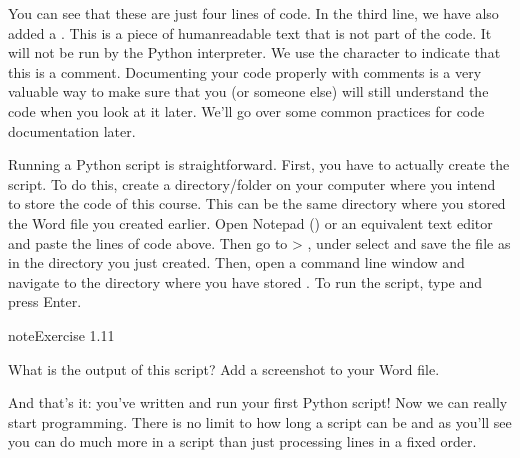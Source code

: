 \documentclass[letterpaper,10pt,english]{jupyterBook}
\begin{document}
\begin{sphinxVerbatim}[commandchars=\\\{\}]
  
  
           
\end{sphinxVerbatim}

\sphinxAtStartPar
You can see that these are just four lines of code. In the third line, we have also added a . This is a piece of human\sphinxhyphen{}readable text that is not part of the code. It will not be run by the Python interpreter. We use the character \sphinxcode{\sphinxupquote{\#}} to indicate that this is a comment. Documenting your code properly with comments is a very valuable way to make sure that you (or someone else) will still understand the code when you look at it later. We’ll go over some common practices for code documentation later.

\sphinxAtStartPar
Running a Python script is straightforward. First, you have to actually create the script. To do this, create a directory/folder on your computer where you intend to store the code of this course. This can be the same directory where you stored the Word file you created earlier. Open Notepad () or an equivalent text editor and paste the lines of code above. Then go to  \sphinxhyphen{}> , under  select  and save the file as  in the directory you just created. Then, open a command line window and navigate to the directory where you have stored . To run the script, type  and press Enter.

\begin{sphinxadmonition}{note}{Exercise 1.11}

\sphinxAtStartPar
What is the output of this script? Add a screenshot to your Word file.
\end{sphinxadmonition}

\sphinxAtStartPar
And that’s it: you’ve written and run your first Python script! Now we can really start programming. There is no limit to how long a script can be and \sphinxhyphen{} as you’ll see \sphinxhyphen{} you can do much more in a script than just processing lines in a fixed order.
\end{document}
